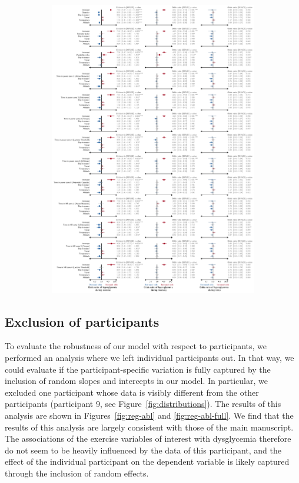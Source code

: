 \documentclass[11pt,a4paper]{article}
\begin{document}
\begin{figure}[hbtp]\ContinuedFloat
    \begin{subfigure}{\textwidth}
        \centering
        \caption{}
        \label{fig:reg-comp-hyper-full}
        \includegraphics[width=\textwidth]{figure/comp/coef_env_comp_binomial_hyper.pdf}
    \end{subfigure}
\end{figure}

\subsection{Exclusion of participants}
To evaluate the robustness of our model with respect to participants, we performed an analysis where we left individual participants out. In that way, we could evaluate if the participant-specific variation is fully captured by the inclusion of random slopes and intercepts in our model. In particular, we excluded one participant whose data is visibly different from the other participants (participant 9, see Figure~\ref{fig:distributions}). The results of this analysis are shown in Figures~\ref{fig:reg-abl} and \ref{fig:reg-abl-full}. We find that the results of this analysis are largely consistent with those of the main manuscript. 
The associations of the exercise variables of interest with dysglycemia therefore do not seem to be heavily influenced by the data of this participant, and the effect of the individual participant on the dependent variable is likely captured through the inclusion of random effects. 
\end{document}
